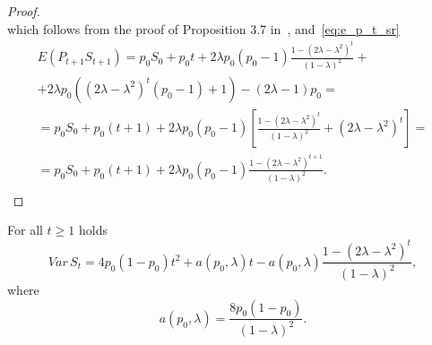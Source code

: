 \documentclass[runningheads]{CMSIM}
\begin{document}
\begin{proof}
\[        \]
        which follows from the proof of Proposition 3.7 in~\cite{ja2019apmat},
        and~\eqref{eq:e_p_t_sr}
        \begin{gather*}
            E(P_{t+1}S_{t+1})=p_{0}S_{0}+p_{0}t+2\lambda p_{0}(p_{0}-1)\frac{1-(2\lambda-\lambda^{2})^{t}}{(1-\lambda)^{2}}+\\
            +2\lambda p_{0}((2\lambda-\lambda^{2})^{t}(p_{0}-1)+1)-(2\lambda-1)p_{0}=\\
            =p_{0}S_{0}+p_{0}(t+1)+2\lambda p_{0}(p_{0}-1)[\frac{1-(2\lambda-\lambda^{2})^{t}}{(1-\lambda)^{2}}+(2\lambda-\lambda^{2})^{t}]=\\
            =p_{0}S_{0}+p_{0}(t+1)+2\lambda p_{0}(p_{0}-1)\frac{1-(2\lambda-\lambda^{2})^{t+1}}{(1-\lambda)^{2}}.\\
        \end{gather*}
    \end{proof}
    \begin{theorem}
        \label{thm:var_s_t_sr}For all $t\ge1$ holds
        \[
            Var\,S_{t}=4p_{0}(1-p_{0})t^{2}+a(p_{0},\lambda)t-a(p_{0},\lambda)\frac{1-(2\lambda-\lambda^{2})^{t}}{(1-\lambda)^{2}},
        \]
        where
        \[
            a(p_{0},\lambda)=\frac{8p_{0}(1-p_{0})}{(1-\lambda)^{2}}.
        \]
    \end{theorem}
\end{document}
